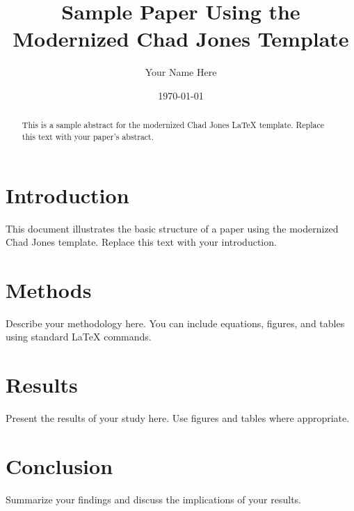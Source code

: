 \documentclass{modern-chad}
\title{Sample Paper Using the Modernized Chad Jones Template}
\author{Your Name Here}
\date{\today}
\begin{document}
\maketitle

\begin{abstract}
This is a sample abstract for the modernized Chad Jones LaTeX template. Replace this text with your paper's abstract.
\end{abstract}

\section{Introduction}
This document illustrates the basic structure of a paper using the modernized Chad Jones template. Replace this text with your introduction.

\section{Methods}
Describe your methodology here. You can include equations, figures, and tables using standard LaTeX commands.

\section{Results}
Present the results of your study here. Use figures and tables where appropriate.

\section{Conclusion}
Summarize your findings and discuss the implications of your results.



\end{document}
